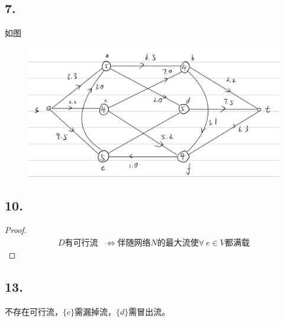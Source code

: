 \documentclass{article}
\begin{document}
\subsection*{7.}
    如图
    \begin{figure}[htbp]
        \centering
        \includegraphics[scale=0.2]{7.PNG}
    \end{figure}

\subsection*{10.}
\begin{proof}
    \begin{align*}
        D\mbox{有可行流}& \Leftrightarrow \mbox{伴随网络}N\mbox{的最大流使}\forall\ e\in V\mbox{都满载}
    \end{align*}
\end{proof}

\subsection*{13.}
    不存在可行流，$\{c\}$需漏掉流，$\{d\}$需冒出流。
\end{document}
